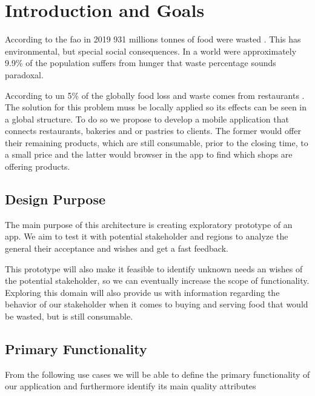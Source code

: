 \section{Introduction and Goals}

According to the \acrfull{fao} in 2019 931 millions tonnes of food were wasted \cite{refart:FAOFW}. This has
environmental, but special social consequences. In a world were approximately 9.9\% of the \cite{refart:AAHWH}
population suffers from hunger that waste percentage sounds paradoxal.

According to \acrfull{un} 5\% of the globally food loss and waste comes from restaurants \cite{refart:UNSP}. 
The solution for this problem muss be locally applied so its effects can be seen in a global structure. To do so we
propose to develop a mobile application that connects restaurants, bakeries and or pastries to clients. 
The former would offer their remaining products, which are still consumable, prior to the closing time, to a small price 
and the latter would browser in the app to find which shops are offering products. 

 
\subsection{Design Purpose}

The main purpose of this architecture is creating exploratory prototype of an \gls{app}. We aim to test it with potential 
\gls{stakeholder} and regions to analyze the general their acceptance and wishes \cite{refbook:DSHC} and get a fast feedback. 

This prototype will also make it feasible to identify unknown needs an wishes of the potential \gls{stakeholder}, so we can eventually
increase the scope of functionality. Exploring this domain will also provide us with information regarding the behavior 
of our \gls{stakeholder} when it comes to buying and serving food that would be wasted, but is still consumable.

\subsection{Primary Functionality}

From the following use cases we will be able to define the primary functionality of our application and furthermore 
identify its main quality attributes 


